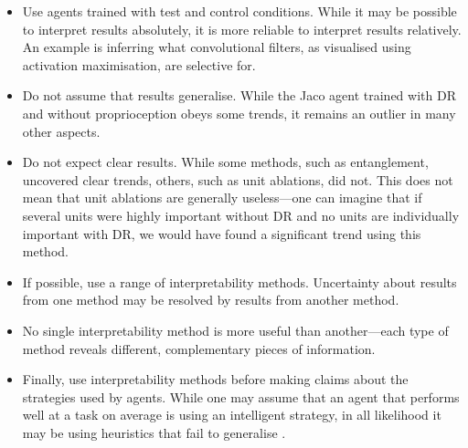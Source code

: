 \begin{itemize}
\item Use agents trained with test and control conditions. While it may be possible to interpret results absolutely, it is more reliable to interpret results relatively. An example is inferring what convolutional filters, as visualised using activation maximisation, are selective for.
\item Do not assume that results generalise. While the Jaco agent trained with DR and without proprioception obeys some trends, it remains an outlier in many other aspects.
\item Do not expect clear results. While some methods, such as entanglement, uncovered clear trends, others, such as unit ablations, did not. This does not mean that unit ablations are generally useless---one can imagine that if several units were highly important without DR and no units are individually important with DR, we would have found a significant trend using this method.
\item If possible, use a range of interpretability methods. Uncertainty about results from one method may be resolved by results from another method.
\item No single interpretability method is more useful than another---each type of method reveals different, complementary pieces of information.
\item Finally, use interpretability methods before making claims about the strategies used by agents. While one may assume that an agent that performs well at a task on average is using an intelligent strategy, in all likelihood it may be using heuristics that fail to generalise \cite{ruderman2019uncovering}.
\end{itemize}